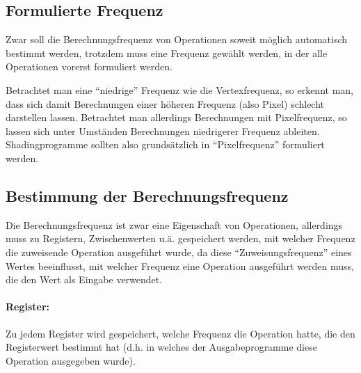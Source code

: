 \documentclass[twoside,a4paper,fleqn,12pt]{book}
\begin{document}
\subsection{Formulierte Frequenz}
\label{formulierte_frequenz}



Zwar soll die Berechnungsfrequenz von Operationen soweit möglich automatisch bestimmt werden, trotzdem muss eine Frequenz
gewählt werden, in der alle Operationen vorerst formuliert werden.

Betrachtet man eine "`niedrige"' Frequenz wie die Vertexfrequenz, so erkennt man, dass sich damit Berechnungen einer höheren
Frequenz (also Pixel) schlecht darstellen lassen. Betrachtet man allerdings Berechnungen mit Pixelfrequenz, so lassen sich
unter Umständen Berechnungen niedrigerer Frequenz ableiten.
Shadingprogramme sollten also grundsätzlich in "`Pixelfrequenz"' formuliert werden.

\subsection{Bestimmung der Berechnungsfrequenz}

Die Berechnungsfrequenz ist zwar eine Eigenschaft von Operationen, allerdings muss zu Registern, Zwischenwerten u.ä. gespeichert
werden, mit welcher Frequenz die zuweisende Operation ausgeführt wurde, da diese "`Zuweisungsfrequenz"' eines Wertes beeinflusst,
mit welcher Frequenz eine Operation ausgeführt werden muss, die den Wert als Eingabe verwendet.

\paragraph{Register:} %
Zu jedem Register wird gespeichert, welche Frequenz die Operation hatte, die den Registerwert bestimmt hat (d.h. in welches der
Ausgabeprogramme diese Operation ausgegeben wurde). 
\end{document}
